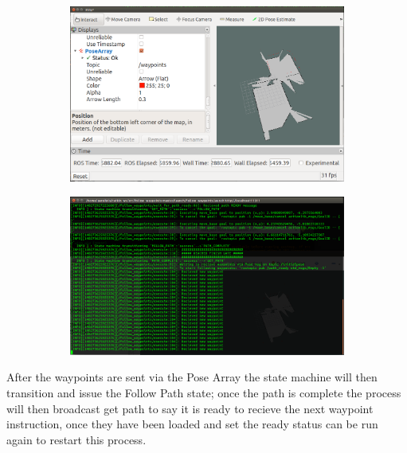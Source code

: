 \documentclass[a4paper, 10pt]{IEEEconf}
\begin{document}
\begin{figure}[H]
\begin{subfigure}{\textwidth}
	\begin{center}
  	\includegraphics[width=\textwidth]{images/rviz}
  	\label{fig:Rviz setup with laser scanner showing the 2D map pgm as a live feed being saved, waypoints setup with pose array for the navigation stack}
  	\end{center}
\end{subfigure}
\begin{subfigure}{\textwidth}
	\begin{center}
  	\includegraphics[width=\textwidth]{images/waypoint}
  	\label{fig:Waypoints being used with the navigation stack and the move base to goal}
  	\end{center}
\end{subfigure}
\end{figure}

After the waypoints are sent via the Pose Array the state machine will then transition and issue the Follow Path state; once the path is complete the process will then broadcast get path to say it is ready to recieve the next waypoint instruction, once they have been loaded and set the ready status can be run again to restart this process.
\end{document}

